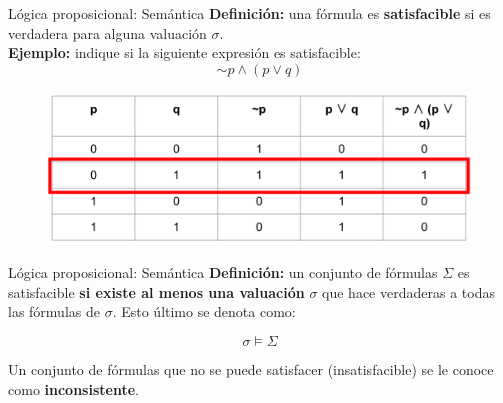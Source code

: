 \documentclass{beamer}
\begin{document}
\begin{frame}{Lógica proposicional: Semántica}
  \textbf{Definición:} una fórmula es \textbf{satisfacible} si es verdadera para
  alguna valuación $\sigma$.\\

  \textbf{Ejemplo:} indique si la siguiente expresión es satisfacible:
  $$\sim p \land (p \vee q)$$

  \begin{figure}
    \centering
    \includegraphics[width=1.\textwidth]{images/tabla_de_verdad_01_rojo.png}
  \end{figure}
\end{frame}


\begin{frame}{Lógica proposicional: Semántica}
  \textbf{Definición:} un conjunto de fórmulas $\Sigma$ es satisfacible
  \textbf{si existe al menos una valuación} $\sigma$ que hace verdaderas a todas
  las fórmulas de $\sigma$. Esto último se denota como:

  $$\sigma \vDash \Sigma$$

  Un conjunto de fórmulas que no se puede satisfacer (insatisfacible) se le
  conoce como \textbf{inconsistente}.
\end{frame}
\end{document}
